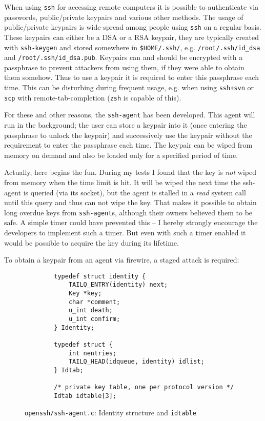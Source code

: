 When using \texttt{ssh} for accessing remote computers it is possible to
authenticate via passwords, public/private keypairs and various other methods.
The usage of public/private keypairs is wide-spread among people using
\texttt{ssh} on a regular basis. These keypairs can either be a DSA or a RSA
keypair, they are typically created with \texttt{ssh-keygen} and stored
somewhere in \texttt{\$HOME/.ssh/}, e.g.  \texttt{/root/.ssh/id\_dsa} and
\texttt{/root/.ssh/id\_dsa.pub}. Keypairs can and should be encrypted with a
passphrase to prevent attackers from using them, if they were able to obtain
them somehow. Thus to use a keypair it is required to enter this passphrase each
time. This can be disturbing during frequent usage, e.g. when using
\texttt{ssh+svn} or \texttt{scp} with remote-tab-completion (\texttt{zsh} is
capable of this).

For these and other reasons, the \texttt{ssh-agent} has been developed. This
agent will run in the background; the user can store a keypair into it (once
entering the passphrase to unlock the keypair) and successively use the keypair
without the requirement to enter the passphrase each time. The keypair can be
wiped from memory on demand and also be loaded only for a specified period of
time.

Actually, here begins the fun. During my tests I found that the key is
\emph{not} wiped from memory when the time limit is hit. It will be wiped the
next time the ssh-agent is queried (via its socket), but the agent is stalled in
a \emph{read} system call until this query and thus can not wipe the key. That
makes it possible to obtain long overdue keys from \texttt{ssh-agent}s, although
their owners believed them to be safe. A simple timer could have prevented this
-- I hereby strongly encourage the developers to implement such a timer. But
even with such a timer enabled it would be possible to acquire the key during
its lifetime.

To obtain a keypair from an agent via firewire, a staged attack is required:

\lstset{language=C, numbers=left, numberstyle=\tiny, frame=lines}

\begin{figure}[ht] \begin{center}
	\tiny
	\begin{lstlisting}
		typedef struct identity {
			TAILQ_ENTRY(identity) next;
			Key *key;
			char *comment;
			u_int death;
			u_int confirm;
		} Identity;

		typedef struct {
			int nentries;
			TAILQ_HEAD(idqueue, identity) idlist;
		} Idtab;

		/* private key table, one per protocol version */
		Idtab idtable[3];
	\end{lstlisting}
	\caption{\texttt{openssh/ssh-agent.c}: Identity structure and \texttt{idtable}}
	\label{fig:code:identity-struct}
\end{center}\end{figure}

